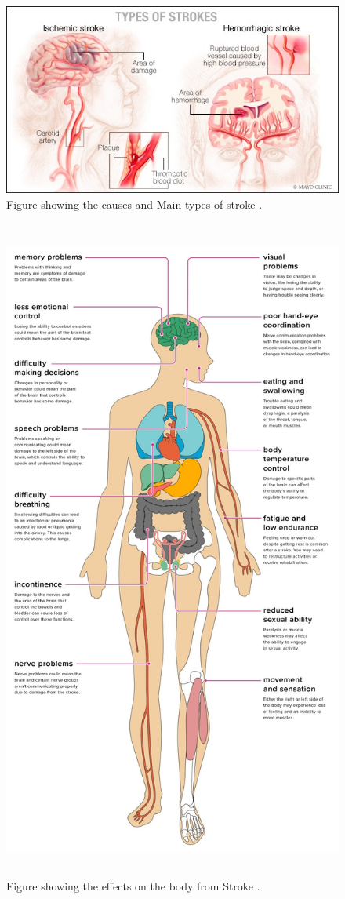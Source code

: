 \begin{figure}[p]%
	\centering
	\includegraphics[width=1.1\linewidth]{figures/ch2/strokecauses}
	\caption{Figure showing the causes and Main types of stroke \cite{mayostroke}.}
	\label{fig:brain}
\end{figure}

\begin{figure}[p]%
	\centering
	\includegraphics[height=22cm]{figures/ch2/strokeeffects}
	\caption{Figure showing the effects on the body from Stroke \cite{Marcin2019}.}
	\label{fig:effects}
\end{figure}
\newpage

